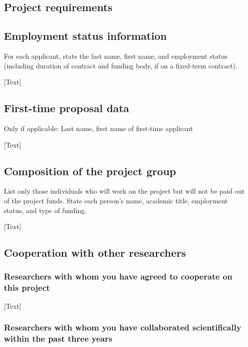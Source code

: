 \documentclass[a4paper,12pt]{article}
\begin{document}
\begin{itemize}[label=--,leftmargin=0.5cm]





\section{Project requirements}

\subsection{Employment status information}
 For each applicant, state the last name, first name, and employment status (including duration of contract and funding body, if on a fixed-term contract).

[Text]

\subsection{First-time proposal data}
Only if applicable: Last name, first name of first-time applicant

[Text]
\subsection{Composition of the project group}
List only those individuals who will work on the project but will not be paid out of the project funds. State each person’s name, academic title, employment status, and type of funding.

[Text]

\subsection{Cooperation with other researchers}

\subsubsection{Researchers with whom you have agreed to cooperate on this project}

[Text]

\subsubsection{Researchers with whom you have collaborated scientifically within the past three years}


\end{itemize}
\end{document}
